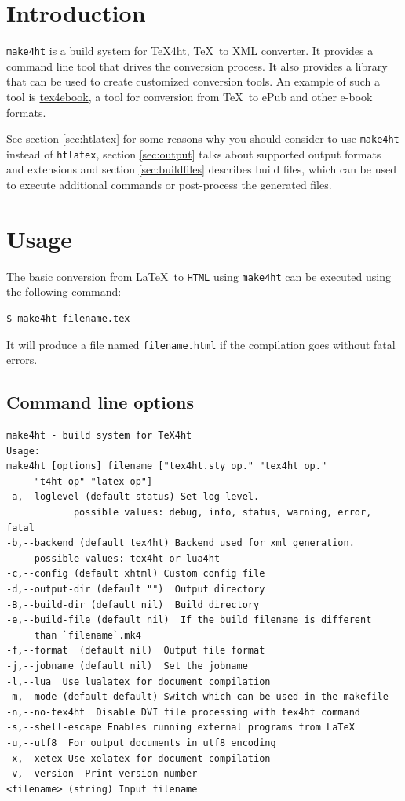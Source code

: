 \section{Introduction}\label{introduction}

\texttt{make4ht} is a build system for
\href{https://tug.org/tex4ht/}{\TeX4ht}, \TeX~to XML converter. It
provides a command line tool that drives the conversion process. It also
provides a library that can be used to create customized conversion
tools. An example of such a tool is
\href{https://github.com/michal-h21/tex4ebook}{tex4ebook}, a tool for
conversion from \TeX~to ePub and other e-book formats.

See section \ref{sec:htlatex} for some reasons why you should consider
to use \texttt{make4ht} instead of \texttt{htlatex}, section
\ref{sec:output} talks about supported output formats and extensions and
section \ref{sec:buildfiles} describes build files, which can be used to
execute additional commands or post-process the generated files.

\section{Usage}\label{usage}

The basic conversion from \LaTeX~to \texttt{HTML} using \texttt{make4ht}
can be executed using the following command:

\begin{verbatim}
$ make4ht filename.tex
\end{verbatim}

It will produce a file named \texttt{filename.html} if the compilation
goes without fatal errors.

\subsection{Command line options}\label{clioptions}

\label{sec:clioptions}

\begin{verbatim}
make4ht - build system for TeX4ht
Usage:
make4ht [options] filename ["tex4ht.sty op." "tex4ht op." 
     "t4ht op" "latex op"]
-a,--loglevel (default status) Set log level.
            possible values: debug, info, status, warning, error, fatal
-b,--backend (default tex4ht) Backend used for xml generation.
     possible values: tex4ht or lua4ht
-c,--config (default xhtml) Custom config file
-d,--output-dir (default "")  Output directory
-B,--build-dir (default nil)  Build directory
-e,--build-file (default nil)  If the build filename is different 
     than `filename`.mk4
-f,--format  (default nil)  Output file format
-j,--jobname (default nil)  Set the jobname
-l,--lua  Use lualatex for document compilation
-m,--mode (default default) Switch which can be used in the makefile
-n,--no-tex4ht  Disable DVI file processing with tex4ht command
-s,--shell-escape Enables running external programs from LaTeX
-u,--utf8  For output documents in utf8 encoding
-x,--xetex Use xelatex for document compilation
-v,--version  Print version number
<filename> (string) Input filename
\end{verbatim}

